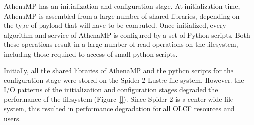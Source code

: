AthenaMP has an initialization and configuration stage. At initialization time,
AthenaMP is assembled from a large number of shared libraries, depending on the
type of payload that will have to be computed. Once initialized, every algorithm
and service of AthenaMP is configured by a set of Python scripts. Both these
operations result in a large number of read operations on the filesystem,
including those required to access of small python scripts.





Initially, all the shared libraries of AthenaMP and the python scripts for the
configuration stage were stored on the Spider 2 Lustre file system. However, the
I/O patterns of the initialization and configuration stages degraded the
performance of the filesystem (Figure~\ref{}). Since Spider 2 is a
center-wide file system, this resulted in  performance degradation for all OLCF
resources and users. 

